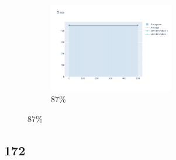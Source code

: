 \documentclass[12pt, fleqn]{report}                             %
\theoremstyle{break}                                            %
\begin{document}
\begin{figure}[ht!]
\begin{subfigure}[b]{0.4\linewidth}
          \includegraphics[width=0.6\textwidth]{Images/170/dia-d.png}
          \caption{87\%}
        \end{subfigure}
      \end{figure}


      \clearpage
      \subsection{172}
\end{document}
